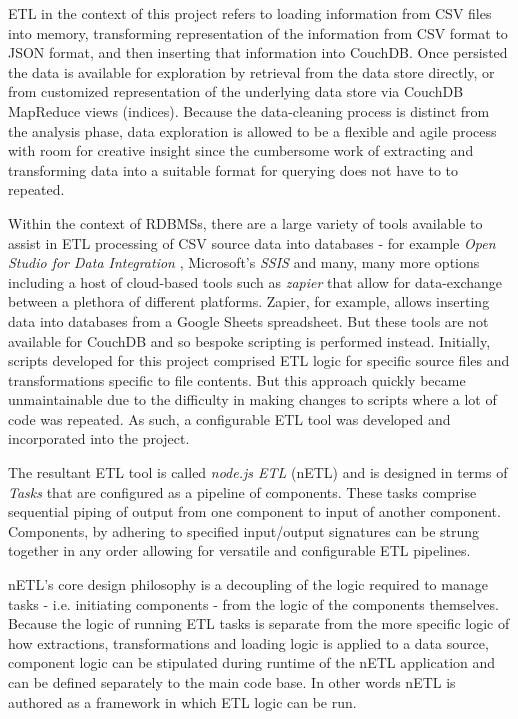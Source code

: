 ETL in the context of this project refers to loading information from CSV files into memory, transforming representation of the information from CSV format to JSON format, and then inserting that information into CouchDB. Once persisted the data is available for exploration by retrieval from the data store directly, or from customized representation of the underlying data store via CouchDB MapReduce views (indices). Because the data-cleaning process is distinct from the analysis phase, data exploration is allowed to be a flexible and agile process with room for creative insight since the cumbersome work of extracting and transforming data into a suitable format for querying does not have to to repeated.

Within the context of RDBMSs, there are a large variety of tools available to assist in ETL processing of CSV source data into databases - for example \textit{Open Studio for Data Integration} \cite{talend}, Microsoft's \textit{SSIS} \cite{ssis} and many, many more options including a host of cloud-based tools such as \textit{zapier} \cite{zapier} that allow for data-exchange between a plethora of different platforms. Zapier, for example, allows inserting data into databases from a Google Sheets spreadsheet. But these tools are not available for CouchDB and so bespoke scripting is performed instead. Initially, scripts developed for this project comprised ETL logic for specific source files and transformations specific to file contents. But this approach quickly became unmaintainable due to the difficulty in making changes to scripts where a lot of code was repeated. As such, a configurable ETL tool was developed and incorporated into the project.

The resultant ETL tool is called \textit{node.js ETL} (nETL) and is designed in terms of \textit{Tasks} that are configured as a pipeline of components. These tasks comprise sequential piping of output from one component to input of another component. Components, by adhering to specified input/output signatures can be strung together in any order allowing for versatile and configurable ETL pipelines.

nETL's core design philosophy is a decoupling of the logic required to manage tasks - i.e. initiating components - from the logic of the components themselves. Because the logic of running ETL tasks is separate from the more specific logic of how extractions, transformations and loading logic is applied to a data source, component logic can be stipulated during runtime of the nETL application and can be defined separately to the main code base. In other words nETL is authored as a framework in which ETL logic can be run.